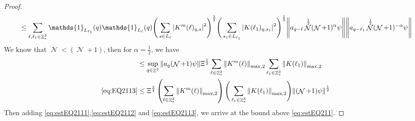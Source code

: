 \documentclass[sn-mathphys, Numbered ,a4paper]{sn-jnl}%
\DeclareMathOperator{\Z}{\mathbb{Z}}
\DeclareMathOperator{\NN}{\mathcal{N}}
\newcommand{\half}{\frac{1}{2}}
\theoremstyle{plain}
\theoremstyle{definition}
\theoremstyle{remark}
\theoremstyle{plain}
\theoremstyle{definition}
\theoremstyle{remark}
\begin{document}
\begin{proof}
\begin{align}
	&\leq\sum\limits_{\ell, \ell_1\in \Z^3_*} \mathds{1}_{L_{\ell_1}}(q) \mathds{1}_{L_{\ell}}(q) \Bigg(\sum\limits_{s \in L_{\ell}} \abs{K^m(\ell)_{q,s}}^2\Bigg)^\half \Bigg(\sum\limits_{s_1 \in L_{\ell_1}} \abs{K(\ell_1)_{q,s_1}}^2\Bigg)^\half \norm{ a_{q-\ell} \NN^\half (\NN+1)^{\alpha}\psi} \norm{ a_{q-\ell_1} \NN^\half (\NN+1)^{-\alpha} \psi }\nonumber\\
\end{align}
We know that $\NN<(\NN+1)$, then for $\alpha = \half$, we have
\begin{align}
	&\leq \sup_{q \in \Z^3}\norm{ a_{q} (\NN+1)\psi} \Xi^\half\sum\limits_{\ell \in \Z^3_*} \norm{  K^{m}(\ell)}_{\mathrm{max,2}}  \sum\limits_{\ell_1 \in \Z^3_*} \norm{K(\ell_1)}_{\mathrm{max,2}} \nonumber\\
	\eqref{eq:EQ2113}&\leq \Xi^{\frac{3}{4}} \left(\sum\limits_{\ell \in \Z^3_*} \norm{K^m(\ell)}_{\mathrm{max,2}}\right) \Bigg(\sum\limits_{\ell_1 \in \Z^3_*} \norm{K(\ell_1)}_{\mathrm{max,2}} \Bigg)  \norm{ (\NN+1)\psi}^\half \label{eq:estEQ2113}
\end{align}
  Then adding \eqref{eq:estEQ2111},\eqref{eq:estEQ2112} and \eqref{eq:estEQ2113}, we arrive at the bound above \eqref{eq:estEQ211}. 
\end{proof}
\end{document}
